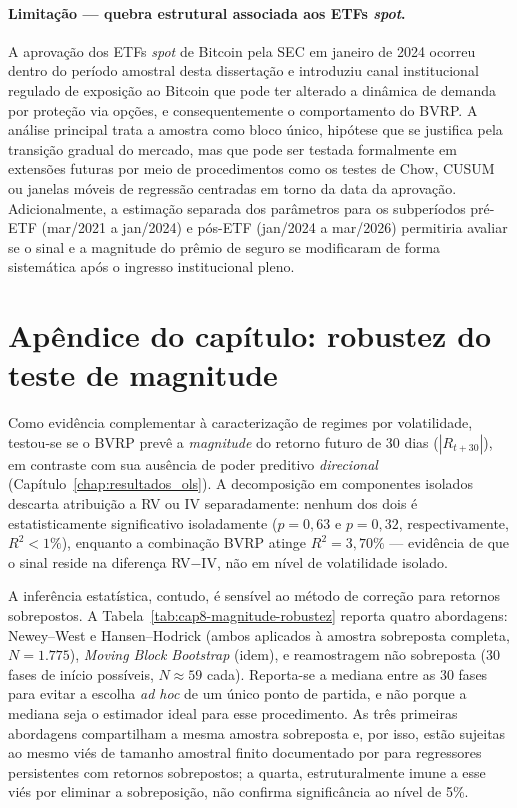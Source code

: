 \paragraph{Limitação --- quebra estrutural associada aos ETFs \textit{spot}.} A aprovação dos ETFs \textit{spot} de Bitcoin pela SEC em janeiro de 2024 ocorreu dentro do período amostral desta dissertação e introduziu canal institucional regulado de exposição ao Bitcoin que pode ter alterado a dinâmica de demanda por proteção via opções, e consequentemente o comportamento do BVRP. A análise principal trata a amostra como bloco único, hipótese que se justifica pela transição gradual do mercado, mas que pode ser testada formalmente em extensões futuras por meio de procedimentos como os testes de Chow, CUSUM ou janelas móveis de regressão centradas em torno da data da aprovação. Adicionalmente, a estimação separada dos parâmetros para os subperíodos pré-ETF (mar/2021 a jan/2024) e pós-ETF (jan/2024 a mar/2026) permitiria avaliar se o sinal e a magnitude do prêmio de seguro se modificaram de forma sistemática após o ingresso institucional pleno.

\section{Apêndice do capítulo: robustez do teste de magnitude}
\label{sec:cap8-apendice-magnitude}

Como evidência complementar à caracterização de regimes por volatilidade,
testou-se se o BVRP prevê a \emph{magnitude} do retorno futuro de 30 dias
($|R_{t+30}|$), em contraste com sua ausência de poder preditivo
\emph{direcional} (Capítulo~\ref{chap:resultados_ols}). A decomposição em
componentes isolados descarta atribuição a RV ou IV separadamente: nenhum
dos dois é estatisticamente significativo isoladamente ($p=0{,}63$ e
$p=0{,}32$, respectivamente, $R^2 < 1\%$), enquanto a combinação BVRP
atinge $R^2=3{,}70\%$ --- evidência de que o sinal reside na diferença
RV$-$IV, não em nível de volatilidade isolado.

A inferência estatística, contudo, é sensível ao método de correção para
retornos sobrepostos. A Tabela~\ref{tab:cap8-magnitude-robustez} reporta
quatro abordagens: Newey--West e Hansen--Hodrick (ambos aplicados à
amostra sobreposta completa, $N=1.775$), \textit{Moving Block Bootstrap}
(idem), e reamostragem não sobreposta (30 fases de início possíveis,
$N\approx59$ cada). Reporta-se a mediana entre as 30 fases para evitar a
escolha \textit{ad hoc} de um único ponto de partida, e não porque a
mediana seja o estimador ideal para esse procedimento. As três primeiras
abordagens compartilham a mesma amostra sobreposta e, por isso, estão
sujeitas ao mesmo viés de tamanho amostral finito documentado por
\citet{fersonSarkissianSimin2003} para regressores persistentes com
retornos sobrepostos; a quarta, estruturalmente imune a esse viés por
eliminar a sobreposição, não confirma significância ao nível de 5\%.

